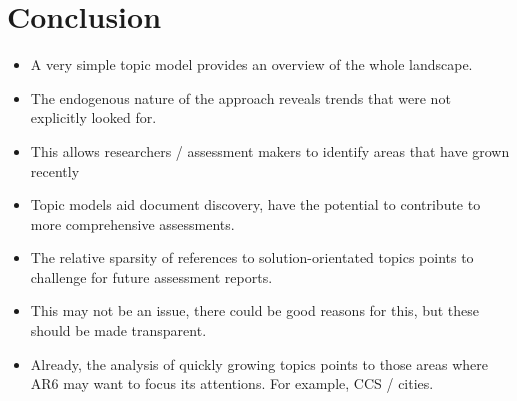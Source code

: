 \documentclass{article}
\begin{document}
\section*{Conclusion}
\begin{itemize}
	\item A very simple topic model provides an overview of the whole landscape.
    \item The endogenous nature of the approach reveals trends that were not explicitly looked for.
    \item This allows researchers / assessment makers to identify areas that have grown recently
    \item Topic models aid document discovery, have the potential to contribute to more comprehensive assessments.
    \item The relative sparsity of references to solution-orientated topics points to challenge for future assessment reports.
	\item This may not be an issue, there could be good reasons for this, but these should be made transparent.
	\item Already, the analysis of quickly growing topics points to those areas where AR6 may want to focus its attentions. For example, CCS / cities.
\end{itemize}







\end{document}
